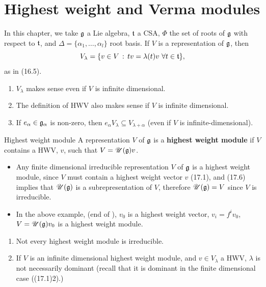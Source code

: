 \documentclass{article}
\begin{document}
\section{Highest weight and Verma modules}
In this chapter, we take $\mathfrak{g}$ a Lie algebra, $\mathfrak{t}$ a CSA, $\Phi$ the set of roots of $\mathfrak{g}$ with respect to $\mathfrak{t}$, and $\Delta = \{ \alpha_{1}, \dots, \alpha_{l}\}$  root basis. If $V$ is a representation of $\mathfrak{g}$, then \[ V_{\lambda} = \{v \in V \, : \, tv = \lambda(t)v \, \, \forall t \in \mathfrak{t}\},\] as in (16.5).
\begin{remark*}\hspace{0.1cm}
    \begin{enumerate}
        \item $V_{\lambda}$ makes sense even if $V$ is infinite dimensional.
        \item The definition of HWV also makes sense if $V$ is infinite dimensional.
        \item If $e_{\alpha} \in \mathfrak{g}_{\alpha}$ is non-zero, then $e_{\alpha}V_{\lambda} \subseteq V_{\lambda+\alpha}$ (even if $V$ is infinite-dimensional).
    \end{enumerate}
\end{remark*}
\begin{fancydefine}{Highest weight module}
    A representation $V$ of $\mathfrak{g}$ is a \textbf{highest weight module} if $V$ contains a HWV, $v$, such that $V=\mathscr{U}(\mathfrak{g})v$.
\end{fancydefine}
\begin{exs}\hspace{0.1cm}
    \begin{itemize}
        \item Any finite dimensional irreducible representation $V$ of $\mathfrak{g}$ is a highest weight module, since $V$ must contain a highest weight vector $v$ (17.1), and (17.6) implies that $\mathscr{U}(\mathfrak{g})$ is a subrepresentation of $V$, therefore $\mathscr{U}(\mathfrak{g}) = V$ since $V$ is irreducible.
        \item In the above example, (end of ), $v_{0}$ is a highest weight vector, $v_{i} = f^{i}v_{0}$, $V= \mathscr{U}(\mathfrak{g})v_{0}$ is a highest weight module.
    \end{itemize}
\end{exs}
\begin{remark*}\hspace{0.1cm}
    \begin{enumerate}
        \item Not every highest weight module is irreducible.
        \item If $V$ is an infinite dimensional highest weight module, and $v \in V_{\lambda}$ a HWV, $\lambda$ is not necessarily dominant (recall that it is dominant in the finite dimensional case ((17.1)2).)
    \end{enumerate}
\end{remark*}
\end{document}
